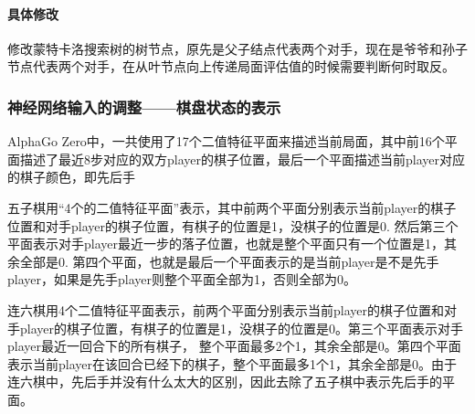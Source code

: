\documentclass[c5size]{ctexart}
\begin{document}
		\paragraph{具体修改}修改蒙特卡洛搜索树的树节点，原先是父子结点代表两个对手，现在是爷爷和孙子节点代表两个对手，在从叶节点向上传递局面评估值的时候需要判断何时取反。
	\subsubsection{神经网络输入的调整——棋盘状态的表示}
		AlphaGo Zero中，一共使用了17个二值特征平面来描述当前局面，其中前16个平面描述了最近8步对应的双方player的棋子位置，最后一个平面描述当前player对应的棋子颜色，即先后手
		
		五子棋用“4个的二值特征平面”表示，其中前两个平面分别表示当前player的棋子位置和对手player的棋子位置，有棋子的位置是1，没棋子的位置是0. 然后第三个平面表示对手player最近一步的落子位置，也就是整个平面只有一个位置是1，其余全部是0. 第四个平面，也就是最后一个平面表示的是当前player是不是先手player，如果是先手player则整个平面全部为1，否则全部为0。
		
		连六棋用4个二值特征平面表示，前两个平面分别表示当前player的棋子位置和对手player的棋子位置，有棋子的位置是1，没棋子的位置是0。第三个平面表示对手player最近一回合下的所有棋子， 整个平面最多2个1，其余全部是0。第四个平面表示当前player在该回合已经下的棋子，整个平面最多1个1，其余全部是0。由于连六棋中，先后手并没有什么太大的区别，因此去除了五子棋中表示先后手的平面。
		
\end{document}
